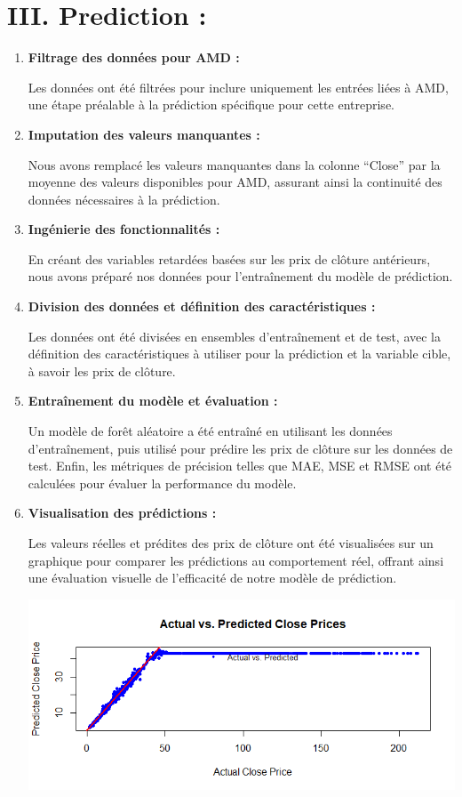 \documentclass[
  letterpaper,
  DIV=11,
  numbers=noendperiod]{scrartcl}
\begin{document}
\hypertarget{iii.-prediction}{%
\section{III. Prediction :}\label{iii.-prediction}}

\begin{enumerate}
\def\labelenumi{\arabic{enumi}.}
\item
  \textbf{Filtrage des données pour AMD :}

  Les données ont été filtrées pour inclure uniquement les entrées liées
  à AMD, une étape préalable à la prédiction spécifique pour cette
  entreprise.
\item
  \textbf{Imputation des valeurs manquantes :}

  Nous avons remplacé les valeurs manquantes dans la colonne ``Close''
  par la moyenne des valeurs disponibles pour AMD, assurant ainsi la
  continuité des données nécessaires à la prédiction.
\item
  \textbf{Ingénierie des fonctionnalités :}

  En créant des variables retardées basées sur les prix de clôture
  antérieurs, nous avons préparé nos données pour l'entraînement du
  modèle de prédiction.
\item
  \textbf{Division des données et définition des caractéristiques :}

  Les données ont été divisées en ensembles d'entraînement et de test,
  avec la définition des caractéristiques à utiliser pour la prédiction
  et la variable cible, à savoir les prix de clôture.
\item
  \textbf{Entraînement du modèle et évaluation :}

  Un modèle de forêt aléatoire a été entraîné en utilisant les données
  d'entraînement, puis utilisé pour prédire les prix de clôture sur les
  données de test. Enfin, les métriques de précision telles que MAE, MSE
  et RMSE ont été calculées pour évaluer la performance du modèle.
\item
  \textbf{Visualisation des prédictions :}

  Les valeurs réelles et prédites des prix de clôture ont été
  visualisées sur un graphique pour comparer les prédictions au
  comportement réel, offrant ainsi une évaluation visuelle de
  l'efficacité de notre modèle de prédiction.

  \includegraphics{images/ActualVSPredictClosePrices.png}
\end{enumerate}
\end{document}
